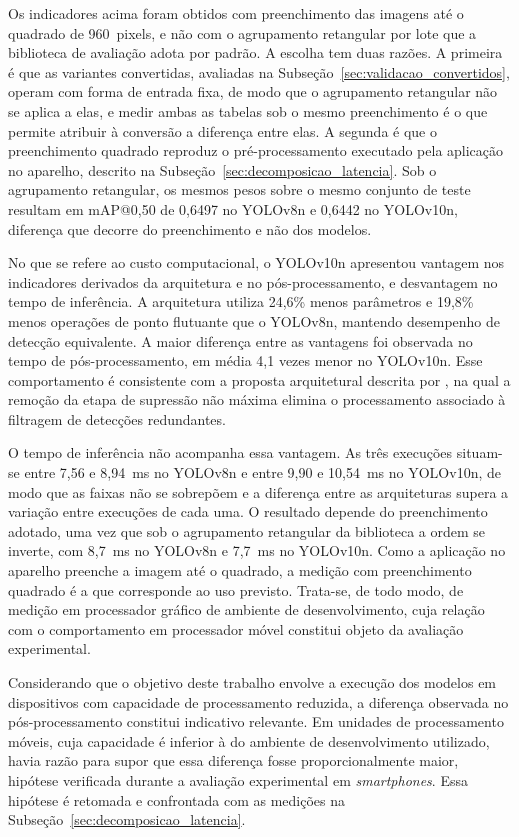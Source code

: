 \documentclass[artigo,times,capa]{iftex2024}
\begin{document}
Os indicadores acima foram obtidos com preenchimento das imagens até o
quadrado de 960~pixels, e não com o agrupamento retangular por lote que a
biblioteca de avaliação adota por padrão. A escolha tem duas razões. A
primeira é que as variantes convertidas, avaliadas na
Subseção~\ref{sec:validacao_convertidos}, operam com forma de entrada
fixa, de modo que o agrupamento retangular não se aplica a elas, e medir
ambas as tabelas sob o mesmo preenchimento é o que permite atribuir à
conversão a diferença entre elas. A segunda é que o preenchimento
quadrado reproduz o pré-processamento executado pela aplicação no
aparelho, descrito na Subseção~\ref{sec:decomposicao_latencia}. Sob o
agrupamento retangular, os mesmos pesos sobre o mesmo conjunto de teste
resultam em \ac{mAP}@0,50 de 0,6497 no YOLOv8n e 0,6442 no YOLOv10n,
diferença que decorre do preenchimento e não dos modelos.

No que se refere ao custo computacional, o YOLOv10n apresentou vantagem
nos indicadores derivados da arquitetura e no pós-processamento, e
desvantagem no tempo de inferência. A arquitetura utiliza 24,6\% menos parâmetros e 19,8\%
menos operações de ponto flutuante que o YOLOv8n, mantendo desempenho de
detecção equivalente. A maior diferença entre as
vantagens foi observada no tempo de pós-processamento, em média 4,1 vezes
menor no YOLOv10n. Esse
comportamento é consistente com a proposta arquitetural descrita por
\textcite{Wang2024YOLOv10}, na qual a remoção da etapa de supressão não máxima
elimina o processamento associado à filtragem de detecções redundantes.

O tempo de inferência não acompanha essa vantagem. As três execuções
situam-se entre 7,56 e 8,94~ms no YOLOv8n e entre 9,90 e 10,54~ms no
YOLOv10n, de modo que as faixas não se sobrepõem e a diferença entre as
arquiteturas supera a variação entre execuções de cada uma. O resultado
depende do preenchimento adotado, uma vez que sob o agrupamento retangular
da biblioteca a ordem se inverte, com 8,7~ms no YOLOv8n e 7,7~ms no
YOLOv10n. Como a aplicação no aparelho preenche a imagem até o quadrado, a
medição com preenchimento quadrado é a que corresponde ao uso previsto.
Trata-se, de todo modo, de medição em processador gráfico de ambiente de
desenvolvimento, cuja relação com o comportamento em processador móvel
constitui objeto da avaliação experimental.

Considerando que o objetivo deste trabalho envolve a execução dos modelos em
dispositivos com capacidade de processamento reduzida, a diferença observada no
pós-processamento constitui indicativo relevante. Em unidades de processamento
móveis, cuja capacidade é inferior à do ambiente de desenvolvimento utilizado,
havia razão para supor que essa diferença fosse proporcionalmente
maior, hipótese verificada durante a avaliação experimental em
\textit{smartphones}. Essa hipótese é retomada e confrontada com as medições
na Subseção~\ref{sec:decomposicao_latencia}.
\end{document}
